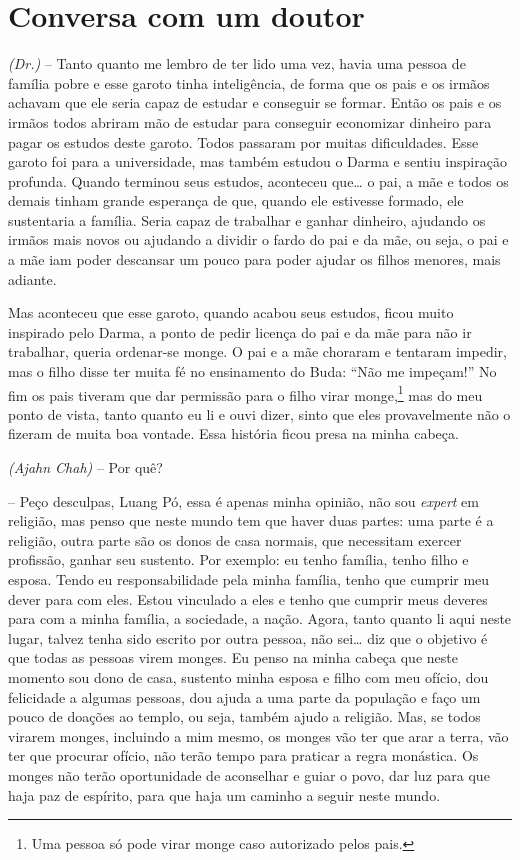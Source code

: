 
\chapter{Conversa com um doutor}
\markright{\theChapterAuthor}

\textit{(Dr.)} -- Tanto quanto me lembro de ter lido uma vez, havia
uma pessoa de família pobre e esse garoto tinha inteligência, de forma
que os pais e os irmãos achavam que ele seria capaz de estudar e
conseguir se formar. Então os pais e os irmãos todos abriram mão de
estudar para conseguir economizar dinheiro para pagar os estudos deste
garoto. Todos passaram por muitas dificuldades. Esse garoto foi para a
universidade, mas também estudou o Darma e sentiu inspiração profunda.
Quando terminou seus estudos, aconteceu que… o pai, a mãe e todos os
demais tinham grande esperança de que, quando ele estivesse formado,
ele sustentaria a família. Seria capaz de trabalhar e ganhar dinheiro,
ajudando os irmãos mais novos ou ajudando a dividir o fardo do pai e da
mãe, ou seja, o pai e a mãe iam poder descansar um pouco para poder
ajudar os filhos menores, mais adiante. 

Mas aconteceu que esse garoto, quando acabou seus estudos, ficou
muito inspirado pelo Darma, a ponto de pedir licença do pai e da mãe
para não ir trabalhar, queria ordenar-se monge. O pai e a mãe choraram
e tentaram impedir, mas o filho disse ter muita fé no ensinamento do
Buda: “Não me impeçam!” No fim os pais tiveram que dar permissão para o
filho virar monge,\footnote{Uma pessoa só pode virar monge caso
autorizado pelos pais.} mas do meu ponto de vista, tanto quanto eu li
e ouvi dizer, sinto que eles provavelmente não o fizeram de muita boa
vontade. Essa história ficou presa na minha cabeça. 

\textit{(Ajahn Chah)} -- Por quê? 

-- Peço desculpas, Luang Pó, essa é apenas minha opinião, não sou
\textit{expert} em religião, mas penso que neste mundo tem que haver
duas partes: uma parte é a religião, outra parte são os donos de casa
normais, que necessitam exercer profissão, ganhar seu sustento. Por
exemplo: eu tenho família, tenho filho e esposa. Tendo eu
responsabilidade pela minha família, tenho que cumprir meu dever para
com eles. Estou vinculado a eles e tenho que cumprir meus deveres para
com a minha família, a sociedade, a nação. Agora, tanto quanto li aqui
neste lugar, talvez tenha sido escrito por outra pessoa, não sei… diz
que o objetivo é que todas as pessoas virem monges. Eu penso na minha
cabeça que neste momento sou dono de casa, sustento minha esposa e
filho com meu ofício, dou felicidade a algumas pessoas, dou ajuda a uma
parte da população e faço um pouco de doações ao templo, ou seja,
também ajudo a religião. Mas, se todos virarem monges, incluindo a mim
mesmo, os monges vão ter que arar a terra, vão ter que procurar ofício,
não terão tempo para praticar a regra monástica. Os monges não terão
oportunidade de aconselhar e guiar o povo, dar luz para que haja paz de
espírito, para que haja um caminho a seguir neste mundo. 

